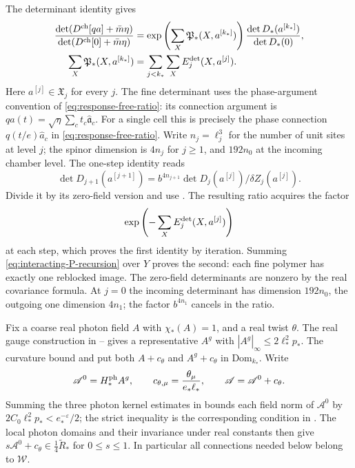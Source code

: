 The determinant identity
\cite[(33)]{NonlinearStep} gives
\begin{align}
 \frac{\det(D^{\rm ch}[qa]+\bar m\eta)}{\det(D^{\rm ch}[0]+\bar m\eta)}
 &=\exp\left(\sum_X\mathfrak P_*(X,a^{[k_*]})\right)
                    \frac{\det D_*(a^{[k_*]})}{\det D_*(0)},
                           \label{eq:interacting-determinant-telescope}\\
 \sum_X\mathfrak P_*(X,a^{[k_*]})
 &=\sum_{j<k_*}\sum_XE_j^{\rm det}(X,a^{[j]}).
                           \label{eq:interacting-P-telescope}
\end{align}
Here $a^{[j]}\in\mathfrak X_j$ for every $j$.
The fine determinant uses the phase-argument convention
of \eqref{eq:response-free-ratio}: its connection argument
is $qa(t)=\sqrt\eta\sum_ct_c\widehat{\mathfrak a}_c$.
For a single cell this is precisely the phase connection
$q(t/e)\widehat a_c$ in \eqref{eq:response-free-ratio}.
Write $n_j=\ell_j^3$ for the number of unit sites at level $j$;
the spinor dimension is $4n_j$ for $j\ge1$, and $192n_0$
at the incoming chamber level. The one-step identity reads
\[
 \det D_{j+1}(a^{[j+1]})
       =b^{4n_{j+1}}\det D_j(a^{[j]})/\delta Z_j(a^{[j]}).
\]
Divide it by its zero-field version and use
\cite[(78)]{FermionBlock}. The resulting
ratio acquires the factor
\[
 \exp\left(-\sum_XE_j^{\rm det}(X,a^{[j]})\right)
\]
at each
step, which proves the first identity by iteration.
Summing \eqref{eq:interacting-P-recursion} over $Y$
proves the second: each fine polymer has exactly
one reblocked image. The zero-field determinants
are nonzero by the real covariance formula.
At $j=0$ the incoming determinant has dimension
$192n_0$, the outgoing one dimension $4n_1$;
the factor $b^{4n_1}$ cancels in the ratio.

Fix a coarse real photon field $A$ with
$\chi_*(A)=1$, and a real twist $\theta$.
The real gauge construction in
\cite[(32)]{MaxwellBlock}--%
\cite[(33)]{MaxwellBlock}
gives a representative $A^g$ with
$|A^g|_\infty\le2\ell_*^2p_*$.
The curvature bound and
\cite[Theorem~B]{MaxwellBlock}
put both $A+c_\theta$ and $A^g+c_\theta$
in $\mathrm{Dom}_{k_*}$.
Write
\[
 \mathscr A^0=H_*^{\rm ph}A^g,\qquad
 c_{\theta,\mu}=\frac{\theta_\mu}{e_*\ell_*},
 \qquad \mathscr A=\mathscr A^0+c_\theta.
\]
Summing the three photon kernel estimates in
\cite[(14)]{MaxwellBlock} bounds each
field norm of $\mathscr A^0$ by
$2C_0\ell_*^2p_*<e_*^{-\varepsilon}/2$;
the strict inequality is the corresponding
condition in \cite[(43)]{TerminalPressure}.
The local photon domains and their invariance
under real constants then give
$s\mathscr A^0+c_\theta\in\frac14\widetilde R_*$
for $0\le s\le1$. In particular all
connections needed below belong to $\mathcal W$.

